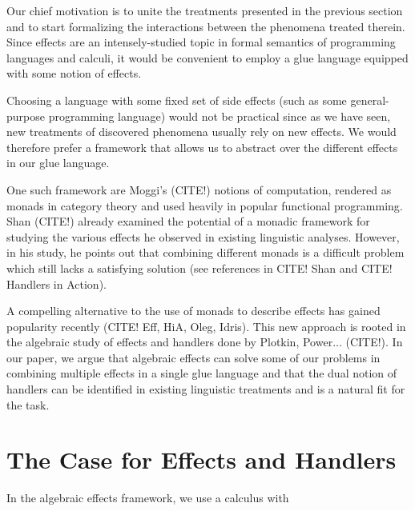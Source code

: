 \documentclass{article}
\begin{document}
Our chief motivation is to unite the treatments presented in the previous
section and to start formalizing the interactions between the phenomena
treated therein. Since effects are an intensely-studied topic in formal
semantics of programming languages and calculi, it would be convenient to
employ a glue language equipped with some notion of effects.

Choosing a language with some fixed set of side effects (such as some
general-purpose programming language) would not be practical since as we have
seen, new treatments of discovered phenomena usually rely on new effects. We
would therefore prefer a framework that allows us to abstract over the
different effects in our glue language.

One such framework are Moggi's (CITE!) notions of computation, rendered as
monads in category theory and used heavily in popular functional
programming. Shan (CITE!) already examined the potential of a monadic
framework for studying the various effects he observed in existing linguistic
analyses. However, in his study, he points out that combining different monads
is a difficult problem which still lacks a satisfying solution (see references
in CITE! Shan and CITE! Handlers in Action).

A compelling alternative to the use of monads to describe effects has gained
popularity recently (CITE! Eff, HiA, Oleg, Idris). This new approach is rooted
in the algebraic study of effects and handlers done by Plotkin,
Power... (CITE!). In our paper, we argue that algebraic effects can solve some
of our problems in combining multiple effects in a single glue language and
that the dual notion of handlers can be identified in existing linguistic
treatments and is a natural fit for the task.


\section{The Case for Effects and Handlers}

In the algebraic effects framework, we use a calculus with 



\end{document}
